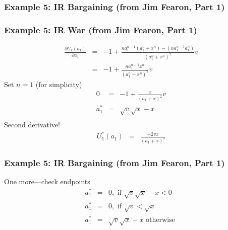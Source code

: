\documentclass{beamer}
\numberwithin{equation}{section}
\begin{document}
\begin{frame}
\frametitle{Example 5: IR Bargaining (from Jim Fearon, Part 1) } 




\end{frame}



\begin{frame}
\frametitle{Example 5: IR War (from Jim Fearon, Part 1) } 



\begin{eqnarray}
\frac{\partial U_{1} (a_{1}) }{\partial a_{1}} & = &  - 1 + \frac{n a_{1}^{n-1} (a_{1}^{n} + x^{n} ) - (n a_{1}^{n-1} a_{1}^{n}) }{(a_{1}^{n} + x^{n} )^2} v \nonumber \\
& =& - 1 + \frac{n a_{1}^{n-1} x^{n} }{(a_{1}^{n} + x^{n} )^2} v \nonumber 
\end{eqnarray}
Set $n = 1$ (for simplicity)
\begin{eqnarray}
0 & = &  -1  + \frac{x}{(a_{1} + x)^2}v \nonumber \\
a_{1}^{*} & = & \sqrt{v}\sqrt{x} - x \nonumber \\
\end{eqnarray}
Second derivative!
\begin{eqnarray}
U_{1}^{''} (a_{1})& = & \frac{- 2 v x  }{(a_{1} + x)^{3} } \nonumber
\end{eqnarray}


\end{frame}

\begin{frame}
\frametitle{Example 5: IR Bargaining (from Jim Fearon, Part 1) } 

One more---check endpoints
\begin{eqnarray}
a_{1}^{*} & = & 0, \text{ if } \sqrt{v}\sqrt{x} - x < 0 \nonumber \\
a_{1}^{*} & = & 0, \text{ if } \sqrt{v}< \sqrt{x} \nonumber \\
a_{1}^{*} & = & \sqrt{v}\sqrt{x} - x \text{ otherwise }\nonumber 
\end{eqnarray}


\end{frame}
\end{document}
